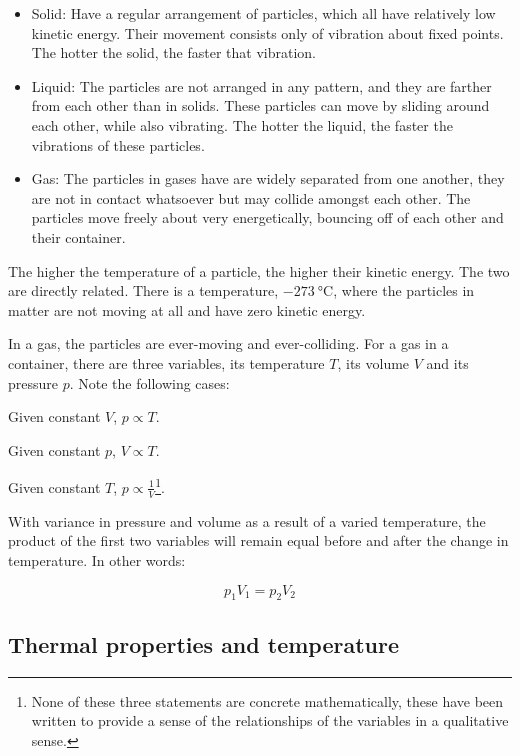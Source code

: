 \begin{itemize}
	\item Solid: Have a regular arrangement of particles, which all have relatively low kinetic
		energy. Their movement consists only of vibration about fixed points. The hotter the
		solid, the faster that vibration.

	\item Liquid: 
		The particles are not arranged in any pattern, and they are farther from each
		other than in solids. These particles can move by sliding around each other, while also
		vibrating. The hotter the liquid, the faster the vibrations of these particles.
	\item Gas: The particles in gases have are widely separated from one another, they are not
		in contact whatsoever but may collide amongst each other. The particles move freely about
		very energetically, bouncing off of each other and their container.

\end{itemize}

The higher the temperature of a particle, the higher their kinetic energy. The two are directly
related. There is a temperature, $-273 \SI{}{\celsius}$, where the particles in matter are not
moving at all and have zero kinetic energy.

In a gas, the particles are ever-moving and ever-colliding. For a gas in a container, there are
three variables, its temperature $T$, its volume $V$ and its pressure $p$. Note the following cases:


\begin{center}
Given constant $V$, $p \propto T$.

Given constant $p$, $V \propto T$.

Given constant $T$, $p \propto \frac{1}{V}$\footnote{None of these three statements are concrete
mathematically, these have been written to provide a sense of the relationships of the variables
in a qualitative sense.}.
\end{center}

With variance in pressure and volume as a result of a varied temperature, the product of the first
two variables will remain equal before and after the change in temperature. In other words:

$$ p_1 V_1 = p_2 V_2 $$

\subsection{Thermal properties and temperature}
